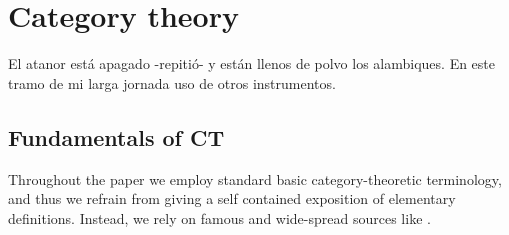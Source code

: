 \section{Category theory}
\epigraph{El atanor está apagado -repitió- y están llenos de polvo los alambiques. En este tramo
	de mi larga jornada uso de otros instrumentos.}{\cite{arena}}
\subsection{Fundamentals of CT}
Throughout the paper we employ standard basic category-theoretic terminology, and thus we refrain from giving a self contained exposition of elementary definitions. Instead, we rely on famous and wide-spread sources like \cite{Bor1,Bor2,McL,riehlcontext,leinster2014basic,simmons2011introduction}.


